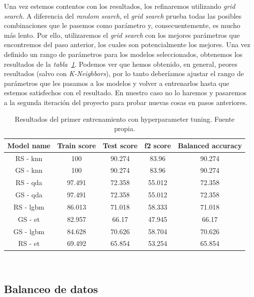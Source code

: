 Una vez estemos contentos con los resultados, los refinaremos utilizando \textit{grid search}. A diferencia del \textit{random search}, el \textit{grid search} prueba todas
las posibles combinaciones que le pasemos como parámetro y, consecuentemente, es mucho más lento. Por ello, utilizaremos el \textit{grid search} con los mejores parámetros que
encontremos del paso anterior, los cuales son potencialmente los mejores. Una vez definido un rango de parámetros para los modelos seleccionados, obtenemos los resultados
de la \textit{tabla\ \ref{tab:hyperparameter-tuning-results}}. Podemos ver que hemos obtenido, en general, peores resultados (salvo con \textit{K-Neighbors}), por lo tanto
deberíamos ajustar el rango de parámetros que les pasamos a los modelos y volver a entrenarlos hasta que estemos satisfechos con el resultado. En nuestro caso no lo haremos
y pasaremos a la segunda iteración del proyecto para probar nuevas cosas en pasos anteriores.

\begin{table}[!h]
    \centering
    \begin{tabular}{|c|cccc|}
        \hline
        Model name & Train score & Test score & f2 score & Balanced accuracy \\ \hline
        RS - knn & 100 & 90.274 & 83.96 & 90.274 \\
        GS - knn & 100 & 90.274 & 83.96 & 90.274 \\
        RS - qda & 97.491 & 72.358 & 55.012 & 72.358 \\
        GS - qda & 97.491 & 72.358 & 55.012 & 72.358 \\
        RS - lgbm & 86.013 & 71.018 & 58.333 & 71.018 \\
        GS - et & 82.957 & 66.17 & 47.945 & 66.17 \\
        GS - lgbm & 84.628 & 70.626 & 58.704 & 70.626 \\
        RS - et & 69.492 & 65.854 & 53.254 & 65.854 \\ \hline
        \end{tabular}
    
    \caption{Resultados del primer entrenamiento con hyperparameter tuning. Fuente propia.}\ \label{tab:hyperparameter-tuning-results}
\end{table}
\clearpage

\subsection{Balanceo de datos}\ \label{sec:i2-balance}

